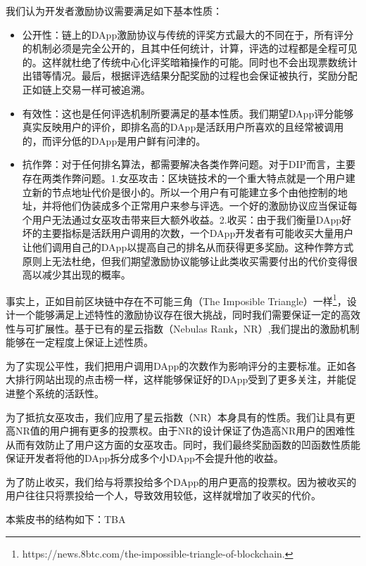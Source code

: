 我们认为开发者激励协议需要满足如下基本性质：
\begin{itemize}
	\item 公开性：链上的DApp激励协议与传统的评奖方式最大的不同在于，所有评分的机制必须是完全公开的，且其中任何统计，计算，评选的过程都是全程可见的。这样就杜绝了传统中心化评奖暗箱操作的可能。同时也不会出现票数统计出错等情况。最后，根据评选结果分配奖励的过程也会保证被执行，奖励分配正如链上交易一样可被追溯。
	\item 有效性：这也是任何评选机制所要满足的基本性质。我们期望DApp评分能够真实反映用户的评价，即排名高的DApp是活跃用户所喜欢的且经常被调用的，而评分低的DApp是用户鲜有问津的。
	\item 抗作弊：对于任何排名算法，都需要解决各类作弊问题。对于DIP而言，主要存在两类作弊问题。1.女巫攻击：区块链技术的一个重大特点就是一个用户建立新的节点地址代价是很小的。所以一个用户有可能建立多个由他控制的地址，并将他们伪装成多个正常用户来参与评选。一个好的激励协议应当保证每个用户无法通过女巫攻击带来巨大额外收益。2.收买：由于我们衡量DApp好坏的主要指标是活跃用户调用的次数，一个DApp开发者有可能收买大量用户让他们调用自己的DApp以提高自己的排名从而获得更多奖励。这种作弊方式原则上无法杜绝，但我们期望激励协议能够让此类收买需要付出的代价变得很高以减少其出现的概率。
\end{itemize}

事实上，正如目前区块链中存在不可能三角（The Imposible Triangle）一样\footnote{https://news.8btc.com/the-impossible-triangle-of-blockchain.}，设计一个能够满足上述特性的激励协议存在很大挑战，同时我们需要保证一定的高效性与可扩展性。基于已有的星云指数（Nebulas Rank，NR）\cite{Nabulasyellowpaper},我们提出的激励机制能够在一定程度上保证上述性质。


为了实现公平性，我们把用户调用DApp的次数作为影响评分的主要标准。正如各大排行网站出现的点击榜一样，这样能够保证好的DApp受到了更多关注，并能促进整个系统的活跃性。

为了抵抗女巫攻击，我们应用了星云指数（NR）本身具有的性质。我们让具有更高NR值的用户拥有更多的投票权。由于NR的设计保证了伪造高NR用户的困难性从而有效防止了用户这方面的女巫攻击。同时，我们最终奖励函数的凹函数性质能保证开发者将他的DApp拆分成多个小DApp不会提升他的收益。

为了防止收买，我们给与将票投给多个DApp的用户更高的投票权。因为被收买的用户往往只将票投给一个人，导致效用较低，这样就增加了收买的代价。

本紫皮书的结构如下：TBA
